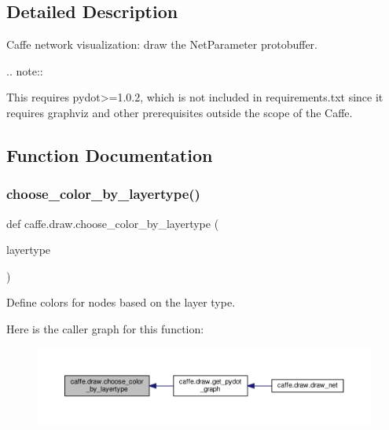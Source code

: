 \subsection{Detailed Description}
\begin{DoxyVerb}Caffe network visualization: draw the NetParameter protobuffer.


.. note::

    This requires pydot>=1.0.2, which is not included in requirements.txt since
    it requires graphviz and other prerequisites outside the scope of the
    Caffe.
\end{DoxyVerb}
 

\subsection{Function Documentation}
\mbox{\label{namespacecaffe_1_1draw_ab06e25fd2bbb0166d3c3ff19d9854828}} 
\subsubsection{\texorpdfstring{choose\+\_\+color\+\_\+by\+\_\+layertype()}{choose\_color\_by\_layertype()}}
{\footnotesize\ttfamily def caffe.\+draw.\+choose\+\_\+color\+\_\+by\+\_\+layertype (\begin{DoxyParamCaption}\item[{}]{layertype }\end{DoxyParamCaption})}

\begin{DoxyVerb}Define colors for nodes based on the layer type.
\end{DoxyVerb}
 Here is the caller graph for this function\+:
\nopagebreak
\begin{figure}[H]
\begin{center}
\leavevmode
\includegraphics[width=350pt]{namespacecaffe_1_1draw_ab06e25fd2bbb0166d3c3ff19d9854828_icgraph}
\end{center}
\end{figure}
\mbox{\label{namespacecaffe_1_1draw_af1c2f41e9d66bae6814590e8c59f64c6}} 
